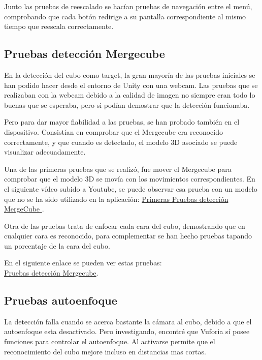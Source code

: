 Junto las pruebas de reescalado se hacían pruebas de navegación entre el menú, comprobando que cada botón redirige a su pantalla correspondiente al mismo tiempo que reescala correctamente.


\subsection{Pruebas detección Mergecube}
En la detección del cubo como target, la gran mayoría de las pruebas iniciales se han podido hacer desde el entorno de Unity con una webcam. Las pruebas que se realizaban con la webcam debido a la calidad de imagen no siempre eran todo lo buenas que se esperaba, pero si podían demostrar que la detección funcionaba.

Pero para dar mayor fiabilidad a las pruebas, se han probado también en el dispositivo. Consistían en comprobar que el Mergecube era reconocido correctamente, y que cuando es detectado, el modelo 3D asociado se puede visualizar adecuadamente.

Una de las primeras pruebas que se realizó, fue mover el Mergecube para comprobar que el modelo 3D se movía con los movimientos correspondientes. En el siguiente vídeo subido a Youtube, se puede observar esa prueba con un modelo que no se ha sido utilizado en la aplicación: \href{https://www.youtube.com/watch?v=SaZeSrDMNEE}{Primeras Pruebas detección MergeCube }.

Otra de las pruebas trata de enfocar cada cara del cubo, demostrando que en cualquier cara es reconocido, para complementar se han hecho pruebas tapando un porcentaje de la cara del cubo. 

En el siguiente enlace se pueden ver estas pruebas:\\ \href{https://www.youtube.com/watch?v=dFsnTGja6-I}{Pruebas detección Mergecube}.

\subsection{Pruebas autoenfoque}
La detección falla cuando se acerca bastante la cámara al cubo, debido a que el autoenfoque esta desactivado. Pero investigando, encontré que Vuforia sí posee funciones para controlar el autoenfoque. Al activarse permite que el reconocimiento del cubo mejore incluso en distancias mas cortas.

